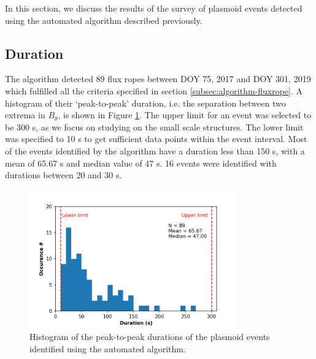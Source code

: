 In this section, we discuss the results of the survey of plasmoid events detected using the automated algorithm described previously. 

\subsection{Duration}

The algorithm detected 89 flux ropes between DOY 75, 2017 and DOY 301, 2019 which fulfilled all the criteria specified in section \ref{subsec:algorithm-fluxrope}. A histogram of their `peak-to-peak' duration, i.e. the separation between two extrema in $B_\theta$, is shown in Figure \ref{fig:duration-histogram}. The upper limit for an event was selected to be 300 s, as we focus on studying on the small scale structures. The lower limit was specified to 10 s to get sufficient data points within the event interval. Most of the events identified by the algorithm have a duration less than 150 s, with a mean of 65.67 s and median value of 47 s. 16 events were identified with durations between 20 and 30 s. 

\begin{figure}
    \centering
    \includegraphics[width=0.8\textwidth]{images6/duration_histogram.png}
    \caption{Histogram of the peak-to-peak durations of the plasmoid events identified using the automated algorithm. }
    \label{fig:duration-histogram}
\end{figure}

